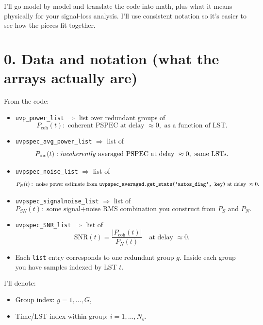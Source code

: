 \documentclass[11pt]{article}
\begin{document}
I’ll go model by model and translate the code into math, plus what it means physically for your signal-loss analysis. I’ll use consistent notation so it’s easier to see how the pieces fit together.

\section*{0. Data and notation (what the arrays actually are)}

From the code:

\begin{itemize}[leftmargin=*]
  \item \texttt{uvp\_power\_list} $\Rightarrow$ list over redundant groups of
  \[
    P_{\mathrm{coh}}(t): \text{ coherent PSPEC at delay } \approx 0, \text{ as a function of LST.}
  \]

  \item \texttt{uvpspec\_avg\_power\_list} $\Rightarrow$ list of
  \[
    P_{\mathrm{inc}}(t): \text{\emph{incoherently} averaged PSPEC at delay } \approx 0, \text{ same LSTs.}
  \]

  \item \texttt{uvpspec\_noise\_list} $\Rightarrow$ list of
  \[
    P_N(t): \text{ noise power estimate from \texttt{uvpspec\_averaged.get\_stats('autos\_diag', key)} at delay } \approx 0.
  \]

  \item \texttt{uvpspec\_signalnoise\_list} $\Rightarrow$ list of
  \[
    P_{SN}(t): \text{ some signal+noise RMS combination you construct from } P_S \text{ and } P_N.
  \]

  \item \texttt{uvpspec\_SNR\_list} $\Rightarrow$ list of
  \[
    \mathrm{SNR}(t) = \frac{\bigl|P_{\mathrm{coh}}(t)\bigr|}{P_N(t)} \quad \text{at delay } \approx 0.
  \]

  \item Each \texttt{list} entry corresponds to one redundant group $g$. Inside each group you have samples indexed by LST $t$.
\end{itemize}

I’ll denote:

\begin{itemize}[leftmargin=*]
  \item Group index: $g = 1, \dots, G$,
  \item Time/LST index within group: $i = 1, \dots, N_g$.
\end{itemize}
\end{document}
